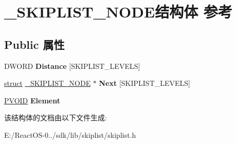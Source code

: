 \hypertarget{struct___s_k_i_p_l_i_s_t___n_o_d_e}{}\section{\+\_\+\+S\+K\+I\+P\+L\+I\+S\+T\+\_\+\+N\+O\+D\+E结构体 参考}
\label{struct___s_k_i_p_l_i_s_t___n_o_d_e}
\subsection*{Public 属性}
\begin{DoxyCompactItemize}
\item 
\mbox{\label{struct___s_k_i_p_l_i_s_t___n_o_d_e_a02fa6c1266489e2cbd7a3e8a27252bcf}} 
D\+W\+O\+RD {\bfseries Distance} \mbox{[}S\+K\+I\+P\+L\+I\+S\+T\+\_\+\+L\+E\+V\+E\+LS\mbox{]}
\item 
\mbox{\label{struct___s_k_i_p_l_i_s_t___n_o_d_e_a78cc2734b74933085802591609fdc70c}} 
\hyperlink{interfacestruct}{struct} \hyperlink{struct___s_k_i_p_l_i_s_t___n_o_d_e}{\+\_\+\+S\+K\+I\+P\+L\+I\+S\+T\+\_\+\+N\+O\+DE} $\ast$ {\bfseries Next} \mbox{[}S\+K\+I\+P\+L\+I\+S\+T\+\_\+\+L\+E\+V\+E\+LS\mbox{]}
\item 
\mbox{\label{struct___s_k_i_p_l_i_s_t___n_o_d_e_ad58fdc482174dc5ca8ab8485054da780}} 
\hyperlink{interfacevoid}{P\+V\+O\+ID} {\bfseries Element}
\end{DoxyCompactItemize}


该结构体的文档由以下文件生成\+:\begin{DoxyCompactItemize}
\item 
E\+:/\+React\+O\+S-\/0../sdk/lib/skiplist/skiplist.\+h\end{DoxyCompactItemize}
